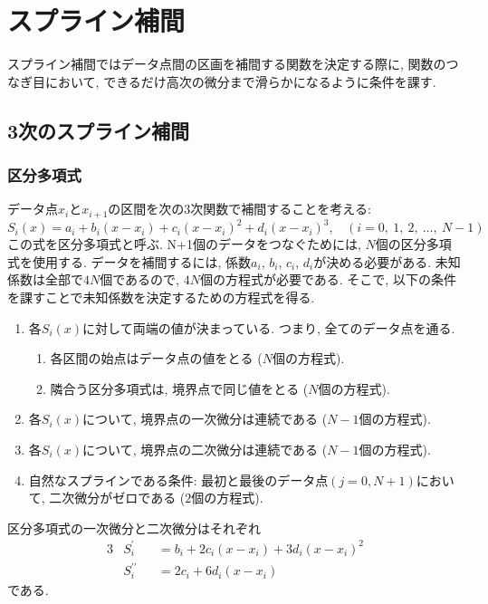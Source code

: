 \clearpage

\section{スプライン補間}
スプライン補間ではデータ点間の区画を補間する関数を決定する際に, 関数のつなぎ目において, できるだけ高次の微分まで滑らかになるように条件を課す.

\subsection{3次のスプライン補間}
\subsubsection{区分多項式}
データ点$x_{i}$と$x_{i+1}$の区間を次の3次関数で補間することを考える:
\begin{equation}
    S_{i} (x) =
    a_{i} +
    b_{i} (x - x_{i}) +
    c_{i} (x - x_{i})^{2} +
    d_{i} (x - x_{i})^{3}
    ,~~~~
    (i = 0,~1,~2,~\ldots,~N-1)
\end{equation}
この式を区分多項式と呼ぶ. N+1個のデータをつなぐためには, $N$個の区分多項式を使用する.
データを補間するには, 係数$a_{i}$, $b_{i}$, $c_{i}$, $d_{i}$が決める必要がある.
未知係数は全部で$4N$個であるので, $4N$個の方程式が必要である.
そこで, 以下の条件を課すことで未知係数を決定するための方程式を得る.
\begin{enumerate}
    \item 各$S_{i}(x)$に対して両端の値が決まっている. つまり, 全てのデータ点を通る.
    \begin{enumerate}
        \item 各区間の始点はデータ点の値をとる ($N$個の方程式).
        \item 隣合う区分多項式は, 境界点で同じ値をとる ($N$個の方程式).
    \end{enumerate}
    \item 各$S_{i}(x)$について, 境界点の一次微分は連続である ($N-1$個の方程式).
    \item 各$S_{i}(x)$について, 境界点の二次微分は連続である ($N-1$個の方程式).
    \item 自然なスプラインである条件: 最初と最後のデータ点$(j=0,N+1)$において, 二次微分がゼロである ($2$個の方程式).
\end{enumerate}
区分多項式の一次微分と二次微分はそれぞれ
\begin{alignat}{3}
    & S_{i}^{\prime} &&=
      b_{i} +
    2 c_{i} (x - x_{i}) +
    3 d_{i} (x - x_{i})^{2}
    \\
    & S_{i}^{\prime\prime} &&=
    2 c_{i} +
    6 d_{i} (x - x_{i})
\end{alignat}
である.

